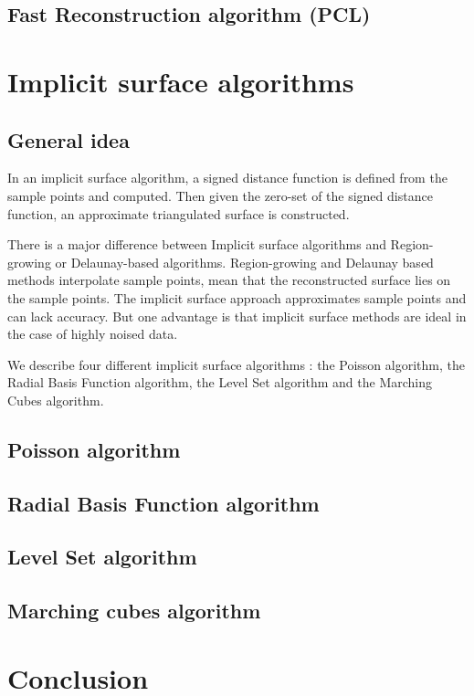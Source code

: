 \documentclass[a4paper]{article}
\begin{document}
\subsection{Fast Reconstruction algorithm (PCL)}
\newpage

\section{Implicit surface algorithms}
\subsection{General idea}
In an implicit surface algorithm, a signed distance function is defined from the sample points and computed. Then given the zero-set of the signed distance function, an approximate triangulated surface is constructed.

There is a major difference between Implicit surface algorithms and Region-growing or Delaunay-based algorithms. Region-growing and Delaunay based methods interpolate sample points, mean that the reconstructed surface lies on the sample points. The implicit surface approach approximates sample points and can lack accuracy. But one advantage is that implicit surface methods are ideal in the case of highly noised data.

We describe four different implicit surface algorithms : the Poisson algorithm, the Radial Basis Function algorithm, the Level Set algorithm and the Marching Cubes algorithm.


\subsection{Poisson algorithm}

\subsection{Radial Basis Function algorithm}

\subsection{Level Set algorithm}

\subsection{Marching cubes algorithm}


\section*{Conclusion}
\end{document}
